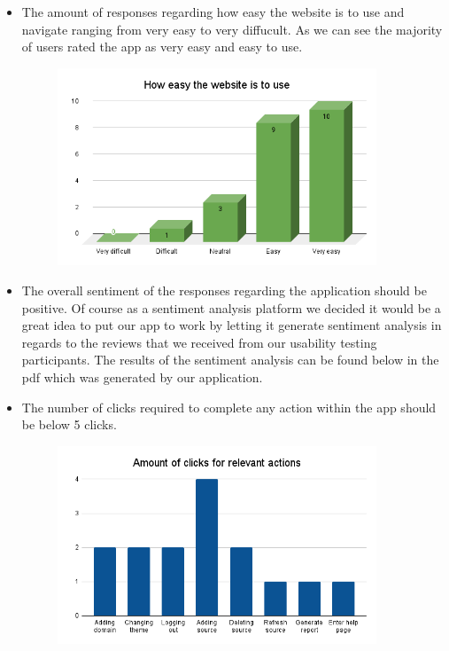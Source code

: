 \documentclass[12pt]{article}
\begin{document}
\begin{itemize}
\begin{itemize}
\begin{figure}[H]
              \end{figure}
              \item The amount of responses regarding how easy the website is to use and navigate ranging from very easy to very diffucult. As we can see the majority of users rated the app as very easy and easy to use.
              \begin{figure}[H]
                \centering
                \includegraphics[width=0.9\textwidth]{How easy the website is to use.png}
              \end{figure}
              \item The overall sentiment of the responses regarding the application should be positive. Of course as a sentiment analysis platform we decided it would be a great idea to put our app to work by letting it generate sentiment analysis in regards to the reviews that we received from our usability testing participants. The results of the sentiment analysis can be found below in the pdf which was generated by our application.
              
              
              \item The number of clicks required to complete any action within the app should be below 5 clicks.
              \begin{figure}[H]
                \centering
                \includegraphics[width=0.9\textwidth]{Amount of clicks for relevant actions-2.png}
              \end{figure}
          \end{itemize}
\end{itemize}
\end{document}
